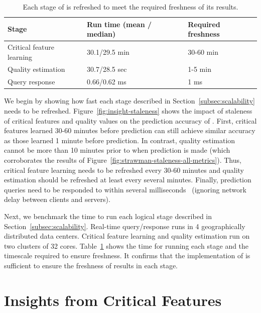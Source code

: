 \begin{table}[t!]
\begin{center}
\begin{tabular}{p{2in}|p{2in}|p{2in}}
{\bf Stage} & {\bf Run time (mean / median)} & {\bf Required freshness} \\ \hline \hline
Critical feature learning & 30.1/29.5 min & 30-60 min \\
Quality estimation  &  30.7/28.5 sec & 1-5 min \\
Query response	 &  0.66/0.62 ms & 1 ms
\end{tabular}
\caption{Each stage of \dda is refreshed to meet the 
required freshness of its results.}
\label{tab:response-all}
\end{center}
\end{table}


We begin by showing how fast each stage described 
in Section~\ref{subsec:scalability} needs to be refreshed. 
Figure~\ref{fig:insight-staleness} shows the impact of 
staleness of critical features and quality values on the 
prediction accuracy of \dda. 
First, critical features learned 30-60 minutes before 
prediction can still achieve similar accuracy as those 
learned 1 minute before prediction. 
In contrast, quality estimation cannot be more than 
10 minutes prior to when prediction is made (which 
corroborates the results of 
Figure~\ref{fig:strawman-staleness-all-metrics}). 
Thus, critical feature learning needs to be refreshed 
every 30-60 minutes and quality estimation should be 
refreshed at least every several minutes. 
Finally, prediction queries need to be responded to within 
several milliseconds~\cite{c3} (ignoring network delay 
between clients and servers).




Next, we benchmark the time to run each logical stage 
described in Section~\ref{subsec:scalability}.
Real-time query/response runs in 4 geographically 
distributed data centers.
Critical feature learning and quality estimation run 
on two clusters of 32 cores. 
Table~\ref{tab:response-all} shows the time for 
running each stage and the timescale required to 
ensure freshness. 
It confirms that the implementation of \dda is sufficient 
to ensure the freshness of results in each stage.



\section{Insights from Critical Features}
\label{sec:cfa:insight}

